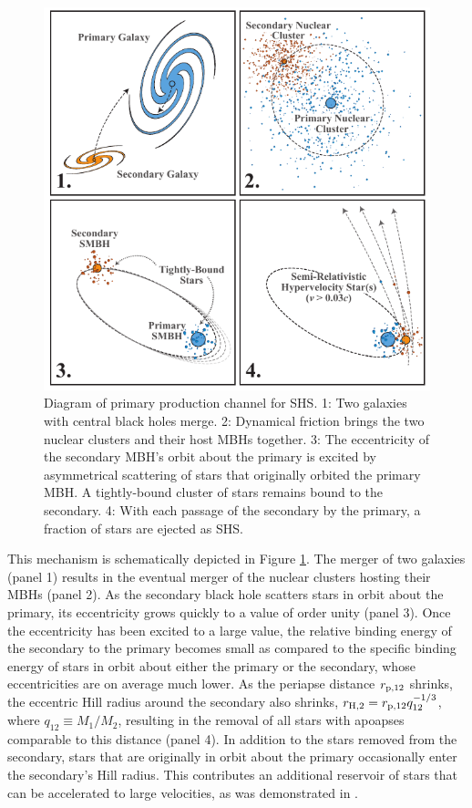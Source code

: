 \documentclass[a4paper,twocolumn]{emulateapj}
\begin{document}
\begin{figure}
\centering\includegraphics[width=\linewidth,clip=true]{shs-diagram}
\caption{Diagram of primary production channel for SHS. 1: Two galaxies with central black holes merge. 2: Dynamical friction brings the two nuclear clusters and their host MBHs together. 3: The eccentricity of the secondary MBH's orbit about the primary is excited by asymmetrical scattering of stars that originally orbited the primary MBH. A tightly-bound cluster of stars remains bound to the secondary. 4: With each passage of the secondary by the primary, a fraction of stars are ejected as SHS.}
\label{fig:diagram}
\end{figure}

This mechanism is schematically depicted in Figure \ref{fig:diagram}. The merger of two galaxies (panel 1) results in the eventual merger of the nuclear clusters hosting their MBHs (panel 2). As the secondary black hole scatters stars in orbit about the primary, its eccentricity grows quickly to a value of order unity (panel 3). Once the eccentricity has been excited to a large value, the relative binding energy of the secondary to the primary becomes small as compared to the specific binding energy of stars in orbit about either the primary or the secondary, whose eccentricities are on average much lower. As the periapse distance $r_{\rm p,12}$ shrinks, the eccentric Hill radius around the secondary also shrinks, $r_{\rm H,2} = r_{\rm p,12} q_{12}^{-1/3}$, where $q_{12} \equiv M_{1}/M_{2}$, resulting in the removal of all stars with apoapses comparable to this distance (panel 4). In addition to the stars removed from the secondary, stars that are originally in orbit about the primary occasionally enter the secondary's Hill radius. This contributes an additional reservoir of stars that can be accelerated to large velocities, as was demonstrated in \citet{Levin:2006a,Sesana:2006a}.
\end{document}
